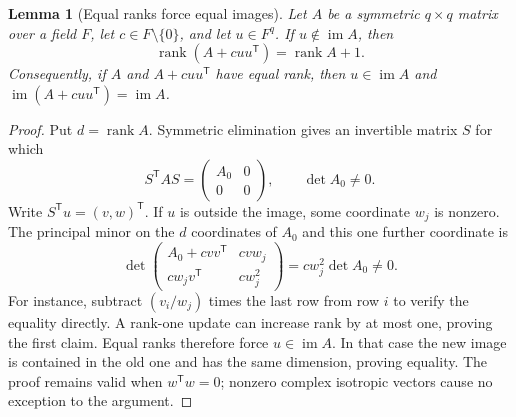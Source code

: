 \documentclass[11pt,a4paper]{article}
\newtheorem{lemma}[theorem]{Lemma}
\theoremstyle{definition}
\theoremstyle{remark}
\numberwithin{equation}{section}
\begin{document}
\begin{lemma}[Equal ranks force equal images]\label{cr:rankone}
Let $A$ be a symmetric $q\times q$ matrix over a field $F$, let
$c\in F\setminus\{0\}$, and let $u\in F^q$.
If $u\notin\operatorname{im}A$, then
\[
 \operatorname{rank}(A+cuu^{\mathsf T})=\operatorname{rank}A+1.
\]
Consequently, if $A$ and $A+cuu^{\mathsf T}$ have equal rank, then
$u\in\operatorname{im}A$ and
$\operatorname{im}(A+cuu^{\mathsf T})=\operatorname{im}A$.
\end{lemma}
\begin{proof}
Put $d=\operatorname{rank}A$.  Symmetric elimination gives an
invertible matrix $S$ for which
\[
 S^{\mathsf T}AS=\begin{pmatrix}A_0&0\\0&0\end{pmatrix},
 \qquad \det A_0\ne0.
\]
Write $S^{\mathsf T}u=(v,w)^{\mathsf T}$.  If $u$ is outside
the image, some coordinate $w_j$ is nonzero.  The principal minor
on the $d$ coordinates of $A_0$ and this one further coordinate is
\begin{equation}\label{cr:minor}
 \det\begin{pmatrix}
 A_0+cvv^{\mathsf T}&cvw_j\\
 cw_jv^{\mathsf T}&cw_j^2
 \end{pmatrix}=cw_j^2\det A_0\ne0.
\end{equation}
For instance, subtract $(v_i/w_j)$ times the last row from row $i$
to verify the equality directly.  A rank-one update can increase
rank by at most one, proving the first claim.  Equal ranks therefore
force $u\in\operatorname{im}A$.  In that case the new image is
contained in the old one and has the same dimension, proving equality.
The proof remains valid when $w^{\mathsf T}w=0$; nonzero complex
isotropic vectors cause no exception to the argument.
\end{proof}
\end{document}
